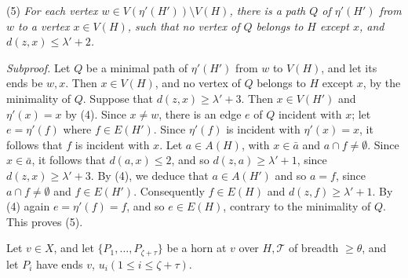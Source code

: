 \hspace*{12pt}(5) \textit{For each vertex $w \in V(\eta'(H')) \setminus V(H)$, there is a path $Q$ of $\eta'(H')$ from $w$ to a vertex $x \in V(H)$, such that no vertex of $Q$ belongs to $H$ except $x$, and $d(z, x) \le \lambda' + 2$.}

\textit{Subproof.} Let $Q$ be a minimal path of $\eta'(H')$ from $w$ to $V(H)$, and let its ends be $w, x$. Then $x \in V(H)$, and no vertex of $Q$ belongs to $H$ except $x$, by the minimality of $Q$. Suppose that $d(z, x) \ge \lambda' + 3$. Then $x \in V(H')$ and $\eta'(x) = x$ by (4). Since $x \ne w$, there is an edge $e$ of $Q$ incident with $x$; let $e = \eta'(f)$ where $f \in E(H')$. Since $\eta'(f)$ is incident with $\eta'(x) = x$, it follows that $f$ is incident with $x$. Let $a \in A(H)$, with $x \in \bar{a}$ and $a \cap f \ne \emptyset$. Since $x \in \bar{a}$, it follows that $d(a, x) \le 2$, and so $d(z, a) \ge \lambda' + 1$, since $d(z, x) \ge \lambda' + 3$. By (4), we deduce that $a \in A(H')$ and so $a = f$, since $a \cap f \ne \emptyset$ and $f \in E(H')$. Consequently $f \in E(H)$ and $d(z, f) \ge \lambda' + 1$. By (4) again $e = \eta'(f) = f$, and so $e \in E(H)$, contrary to the minimality of $Q$. This proves (5).

Let $v \in X$, and let $\{P_1, \ldots, P_{\zeta + \tau}\}$ be a horn at $v$ over $H, \mathcal{T}$ of breadth $\ge \theta$, and let $P_i$ have ends $v$, $u_i(1 \le i \le \zeta + \tau)$.
